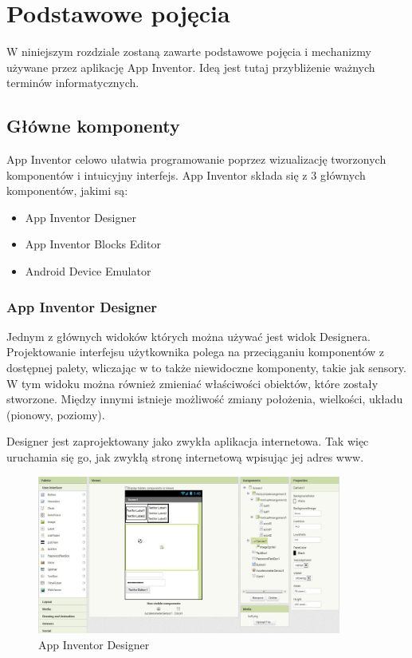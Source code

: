 \chapter{Podstawowe pojęcia}
\label{c2}

W niniejszym rozdziale zostaną zawarte podstawowe pojęcia i mechanizmy używane przez aplikację App Inventor. Ideą jest tutaj przybliżenie ważnych terminów informatycznych.

\section{Główne komponenty}
\label{c22}

App Inventor celowo ułatwia programowanie poprzez wizualizację tworzonych komponentów i intuicyjny interfejs. App Inventor składa się z 3 głównych komponentów, jakimi są:
\begin{itemize}
\item App Inventor Designer
\item App Inventor Blocks Editor
\item Android Device Emulator
\end{itemize}

\subsection{App Inventor Designer}
\label{c221}

Jednym z głównych widoków których można używać jest widok Designera. Projektowanie interfejsu użytkownika polega na przeciąganiu komponentów z dostępnej palety, wliczając w to także niewidoczne komponenty, takie jak sensory. W tym widoku można również zmieniać właściwości obiektów, które zostały stworzone. Między innymi istnieje możliwość zmiany położenia, wielkości, układu (pionowy, poziomy).

Designer jest zaprojektowany jako zwykła aplikacja internetowa. Tak więc uruchamia się go, jak zwykłą stronę internetową wpisując jej adres www.

\begin{figure}[th] 
\centering\includegraphics[width=10cm]{figures/designer}
\caption{App Inventor Designer}
\end{figure}

